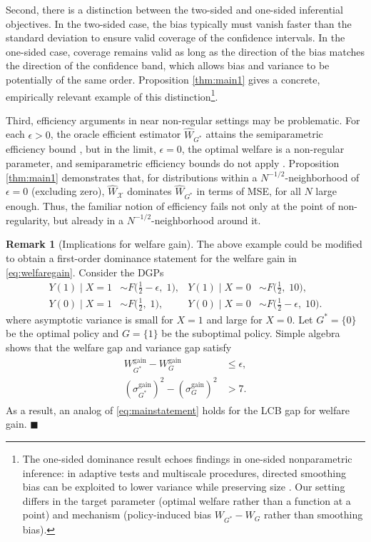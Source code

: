 \documentclass[12pt]{article}
\numberwithin{equation}{section}
\theoremstyle{plain}                         %
\theoremstyle{definition}                  %
\newtheorem{remark}{Remark}
\theoremstyle{remark}                      %
\renewcommand{\qed}{\hfill$\blacksquare$}
\begin{document}
Second, there is a distinction between the two-sided and one-sided inferential objectives.  In the two-sided case, the bias typically must vanish faster than the standard deviation to ensure valid coverage of the confidence intervals. In the one-sided case, coverage remains valid as long as the direction of the bias matches the direction of the confidence band, which allows bias and variance to be potentially of the same order.  Proposition \ref{thm:main1} gives a concrete, empirically relevant example of this distinction\footnote{The one-sided dominance result echoes findings in one-sided nonparametric inference: in adaptive tests and multiscale procedures, directed smoothing bias can be exploited to lower variance while preserving size \citep{DumbgenSpokoiny2001, Armstrong2015}. Our setting differs in the target parameter (optimal welfare rather than a function at a point) and mechanism (policy-induced bias $W_{G^{*}} - W_G$ rather than smoothing bias).   }. 


Third, efficiency arguments in near non-regular settings may be problematic. For each $\epsilon>0$, the oracle efficient estimator $\widehat{W}_{G^*}$ attains the semiparametric efficiency bound \citep{LuedtkeLaan}, but in the limit, $\epsilon=0$, the optimal welfare is a non-regular parameter, and semiparametric efficiency bounds do not apply \citep{HiranoPorter2012}. Proposition \ref{thm:main1} demonstrates that, for distributions within a $N^{-1/2}$-neighborhood of $\epsilon=0$ (excluding zero), $\widehat{W}_{\mathcal{X}}$ dominates $\widehat{W}_{G^{*}}$ in terms of MSE, for all $N$ large enough. Thus, the familiar notion of efficiency fails not only at the point of non-regularity, but already in a $N^{-1/2}$-neighborhood around it. 


\begin{remark}[Implications for welfare gain]
\label{rm:welfaregain}
The above example could be modified to obtain a first-order dominance statement for the welfare gain in \eqref{eq:welfaregain}. Consider the DGPs 
\begin{align}
Y(1)\mid X=1 &\sim F\bigl(\tfrac12 - \epsilon,\;1\bigr), 
& 
Y(1)\mid X=0 &\sim F\bigl(\tfrac12,\;10\bigr), 
\label{eq:dgp1}\\
Y(0)\mid X=1 &\sim F\bigl(\tfrac12,\;1\bigr), 
& 
Y(0)\mid X=0 &\sim F\bigl(\tfrac12 - \epsilon,\;10\bigr).
\label{eq:dgp3}
\end{align}
where asymptotic variance is small for $X=1$ and large for $X=0$. Let $G^{*} = \{0\}$ be the optimal policy and $G = \{1\}$ be the suboptimal policy. Simple algebra shows that the welfare gap and variance gap satisfy
 \begin{align}
\label{eq:puzzlebias2}
W^{\text{gain}}_{G^{*}}-W^{\text{gain}}_{G}  &\leq \epsilon,  \\
\label{eq:puzzlebias3}
 (\sigma^{\text{gain}}_{G^{*}})^2-(\sigma^{\text{gain}}_{G})^2_{}  &> 7.
\end{align}
As a result, an analog of \eqref{eq:mainstatement} holds for the LCB gap for welfare gain.  \qed 
 \end{remark}
\end{document}
